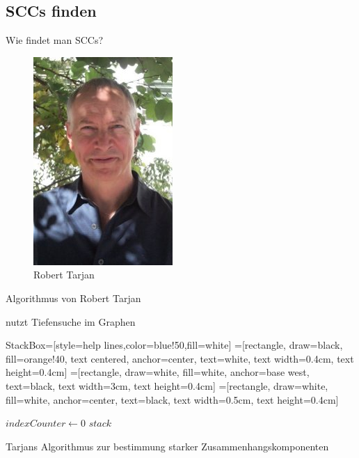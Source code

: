 \subsection{SCCs finden}
\begin{frame}{Wie findet man SCCs?}{}
\begin{figure}
  \begin{center}
    \includegraphics{Material/Bob_Tarjan.jpg}
  \end{center}
  \caption{Robert Tarjan}
\end{figure}
Algorithmus von Robert Tarjan


nutzt Tiefensuche im Graphen
\end{frame}


\tikzstyle StackBox=[style=help lines,color=blue!50,fill=white]
=[rectangle, draw=black, 
		fill=orange!40, 
        text centered, anchor=center, text=white, text width=0.4cm, text height=0.4cm]
=[rectangle, draw=white, 
		fill=white, anchor=base west, text=black, text width=3cm, text height=0.4cm]
=[rectangle, draw=white, 
		fill=white, anchor=center, text=black, text width=0.5cm, text height=0.4cm]

\begin{frame}

\begin{algorithm}[H]
	\begin{algorithmic}
			\State $indexCounter \gets 0$
			\State $stack$
				\EndIf
			\EndFor
		\EndFunction
	\end{algorithmic}
\caption{Tarjans Algorithmus zur bestimmung starker Zusammenhangskomponenten}
\label{alg:seq1}
\end{algorithm}
\end{frame}

